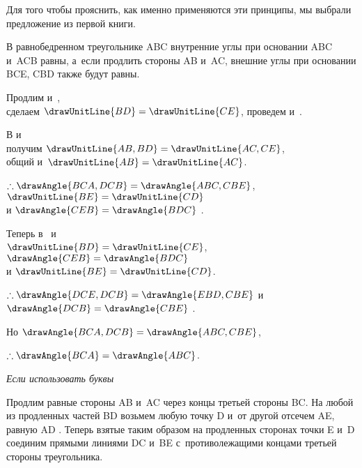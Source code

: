\documentclass[letters,booklanguage=russian]{byrnebook}
\begin{document}
Для того чтобы прояснить, как именно применяются эти принципы, мы выбрали предложение из первой книги.

В равнобедренном треугольнике ABC внутренние углы при основании ABC и~ACB равны, а~если продлить стороны AB и~AC, внешние углы при основании BCE, CBD также будут равны.

\begin{center}
\drawCurrentPictureInMargin Продлим  и~,\\
сделаем $\drawUnitLine{BD} = \drawUnitLine{CE}$, проведем  и~.

В
и
\\
получим $\drawUnitLine{AB,BD} = \drawUnitLine{AC,CE}$,\\
 общий и~$\drawUnitLine{AB} = \drawUnitLine{AC}$.

$\therefore \drawAngle{BCA,DCB} = \drawAngle{ABC,CBE}$, $\drawUnitLine{BE} = \drawUnitLine{CD}$\\
и $\drawAngle{CEB} = \drawAngle{BDC}$ .

Теперь в~ и~\\
$\drawUnitLine{BD} = \drawUnitLine{CE}$, $\drawAngle{CEB} = \drawAngle{BDC}$\\
и $\drawUnitLine{BE} = \drawUnitLine{CD}$.

$\therefore \drawAngle{DCE,DCB} = \drawAngle{EBD,CBE}$
и $\drawAngle{DCB} = \drawAngle{CBE}$ .

Но $\drawAngle{BCA,DCB} = \drawAngle{ABC,CBE}$, 

$\therefore \drawAngle{BCA} = \drawAngle{ABC}$.
\end{center}

\qedNB

\begin{center}
\emph{Если использовать буквы}
\end{center}

Продлим равные стороны AB и~AC через концы третьей стороны BC. На любой из продленных частей BD возьмем любую точку D и~от другой отсечем AE, равную AD . Теперь взятые таким образом на продленных сторонах точки E и~D соединим прямыми линиями DC и~BE с~противолежащими концами третьей стороны треугольника.
\end{document}
